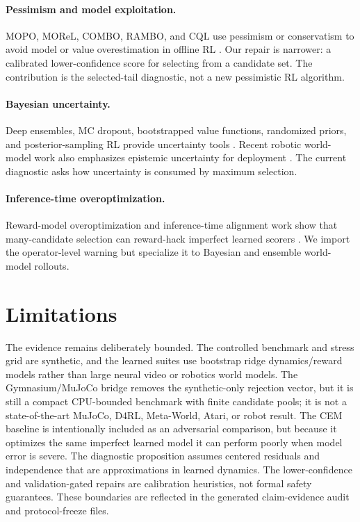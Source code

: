 \documentclass{article}
\begin{document}
\paragraph{Pessimism and model exploitation.}
MOPO, MOReL, COMBO, RAMBO, and CQL use pessimism or conservatism to avoid model
or value overestimation in offline RL \citep{yu2020mopo,kidambi2020morel,
yu2021combo,rigter2022rambo,kumar2020cql}. Our repair is narrower: a
calibrated lower-confidence score for selecting from a candidate set. The
contribution is the selected-tail diagnostic, not a new pessimistic RL
algorithm.

\paragraph{Bayesian uncertainty.}
Deep ensembles, MC dropout, bootstrapped value functions, randomized priors,
and posterior-sampling RL provide uncertainty tools
\citep{lakshminarayanan2017deep,gal2016dropout,osband2016bootstrapped,
osband2018randomized,fan2021posterior}. Recent robotic world-model work also
emphasizes epistemic uncertainty for deployment \citep{li2025rwm}. The current
diagnostic asks how uncertainty is consumed by maximum selection.

\paragraph{Inference-time overoptimization.}
Reward-model overoptimization and inference-time alignment work show that
many-candidate selection can reward-hack imperfect learned scorers
\citep{gao2023scaling,jinnai2024regularized,huang2025bon,yu2026caution,
hsu2026tails}. We import the operator-level warning but specialize it to
Bayesian and ensemble world-model rollouts.

\section{Limitations}

The evidence remains deliberately bounded. The controlled benchmark and stress
grid are synthetic, and the learned suites use bootstrap ridge dynamics/reward
models rather than large neural video or robotics world models. The
Gymnasium/MuJoCo bridge removes the synthetic-only rejection vector, but it is
still a compact CPU-bounded benchmark with finite candidate pools; it is not a
state-of-the-art MuJoCo, D4RL, Meta-World, Atari, or robot result. The CEM
baseline is intentionally included as an adversarial comparison, but because it
optimizes the same imperfect learned model it can perform poorly when model
error is severe. The diagnostic proposition assumes centered residuals and
independence that are approximations in learned dynamics. The
lower-confidence and validation-gated repairs are calibration heuristics, not
formal safety guarantees. These boundaries are reflected in the generated
claim-evidence audit and protocol-freeze files.
\end{document}
